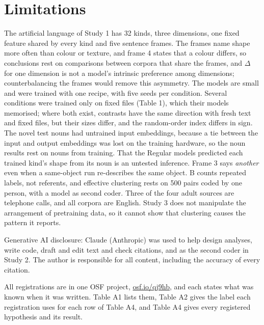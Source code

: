 \section{Limitations}
The artificial language of Study 1 has 32 kinds, three dimensions, one fixed feature shared by every kind and five sentence frames. The frames name shape more often than colour or texture, and frame 4 states that a colour differs, so conclusions rest on comparisons between corpora that share the frames, and $\Delta$ for one dimension is not a model's intrinsic preference among dimensions; counterbalancing the frames would remove this asymmetry. The models are small and were trained with one recipe, with five seeds per condition. Several conditions were trained only on fixed files (Table 1), which their models memorised; where both exist, contrasts have the same direction with fresh text and fixed files, but their sizes differ, and the random-order index differs in sign. The novel test nouns had untrained input embeddings, because a tie between the input and output embeddings was lost on the training hardware, so the noun results rest on nouns from training. That the Regular models predicted each trained kind's shape from its noun is an untested inference. Frame 3 says \emph{another} even when a same-object run re-describes the same object. B counts repeated labels, not referents, and effective clustering rests on 500 pairs coded by one person, with a model as second coder. Three of the four adult sources are telephone calls, and all corpora are English. Study 3 does not manipulate the arrangement of pretraining data, so it cannot show that clustering causes the pattern it reports.

\begin{acknowledgments}
Generative AI disclosure: Claude (Anthropic) was used to help design analyses, write code, draft and edit text and check citations, and as the second coder in Study 2. The author is responsible for all content, including the accuracy of every citation.

\end{acknowledgments}



\appendix
\FloatBarrier
{}\label{app:A}
\setcounter{table}{0}\renewcommand{\thetable}{A\arabic{table}}
\setcounter{figure}{0}\renewcommand{\thefigure}{A\arabic{figure}}
All registrations are in one OSF project, \url{osf.io/qj9hb}, and each states what was known when it was written. Table A1 lists them, Table A2 gives the label each registration uses for each row of Table A4, and Table A4 gives every registered hypothesis and its result.

